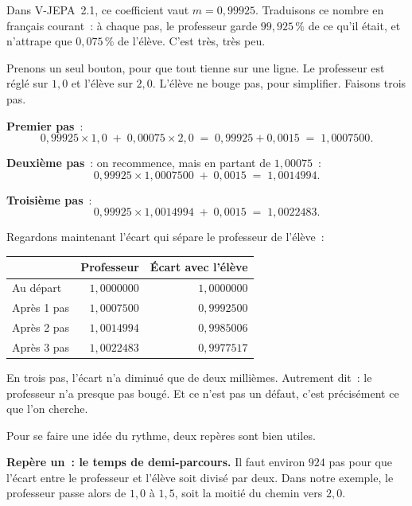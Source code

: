 Dans V-JEPA~2.1, ce coefficient vaut $m = 0{,}99925$. Traduisons ce nombre
en français courant~: à chaque pas, le professeur garde
$99{,}925\,\%$ de ce qu'il était, et n'attrape que $0{,}075\,\%$ de l'élève.
C'est très, très peu.

\begin{exemple}
Prenons un seul bouton, pour que tout tienne sur une ligne. Le professeur
est réglé sur $1{,}0$ et l'élève sur $2{,}0$. L'élève ne bouge pas, pour
simplifier. Faisons trois pas.

\textbf{Premier pas}~:
\[
  0{,}99925 \times 1{,}0 \;+\; 0{,}00075 \times 2{,}0
  \;=\; 0{,}99925 + 0{,}0015 \;=\; 1{,}0007500 .
\]

\textbf{Deuxième pas}~: on recommence, mais en partant de $1{,}00075$~:
\[
  0{,}99925 \times 1{,}0007500 \;+\; 0{,}0015 \;=\; 1{,}0014994 .
\]

\textbf{Troisième pas}~:
\[
  0{,}99925 \times 1{,}0014994 \;+\; 0{,}0015 \;=\; 1{,}0022483 .
\]

Regardons maintenant l'écart qui sépare le professeur de l'élève~:

\begin{center}
\footnotesize
\begin{tabular}{lrr}
\toprule
& \textbf{Professeur} & \textbf{Écart avec l'élève} \\
\midrule
Au départ      & $1{,}0000000$ & $1{,}0000000$ \\
Après 1 pas    & $1{,}0007500$ & $0{,}9992500$ \\
Après 2 pas    & $1{,}0014994$ & $0{,}9985006$ \\
Après 3 pas    & $1{,}0022483$ & $0{,}9977517$ \\
\bottomrule
\end{tabular}
\end{center}

En trois pas, l'écart n'a diminué que de deux millièmes. Autrement dit~: le
professeur n'a presque pas bougé. Et ce n'est pas un défaut, c'est
précisément ce que l'on cherche.
\end{exemple}

Pour se faire une idée du rythme, deux repères sont bien utiles.

\textbf{Repère un~: le temps de demi-parcours.} Il faut environ $924$ pas
pour que l'écart entre le professeur et l'élève soit divisé par deux. Dans
notre exemple, le professeur passe alors de $1{,}0$ à $1{,}5$, soit la
moitié du chemin vers $2{,}0$.

